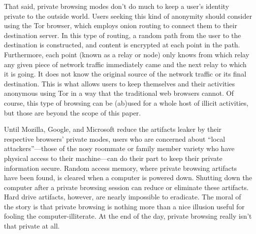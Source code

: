 \documentclass[pdftex,letterpaper,titlepage,12pt]{article}
\begin{document}
  That said, private browsing modes don't do much to keep a user's identity
  private to the outside world. Users seeking this kind of anonymity should 
  consider using the Tor browser, which employs onion routing to connect them 
  to their destination server. In this type of routing, a random path from the 
  user to the destination is constructed, and content is encrypted at each 
  point in the path. Furthermore, each point (known as a relay or node) only 
  knows from which relay any given piece of network traffic immediately came 
  and the next relay to which it is going. It does not know the original source
  of the network traffic or its final destination. This is what allows users to
  keep themselves and their activities anonymous using Tor in a way that the 
  traditional web browsers cannot.\cite{tor13} Of course, this type of browsing
  can be (ab)used for a whole host of illicit activities, but those are beyond
  the scope of this paper.

  Until Mozilla, Google, and Microsoft reduce the artifacts leaker by their
  respective browsers' private modes, users who are concerned about ``local 
  attackers''---those of the nosy roommate or family member variety who have 
  physical access to their machine---can do their part to keep their private
  information secure. Random access memory, where private browsing artifacts
  have been found, is cleared when a computer is powered down. Shutting down
  the computer after a private browsing session can reduce or eliminate these
  artifacts. Hard drive artifacts, however, are nearly impossible to eradicate.
  The moral of the story is that private browsing is nothing more than a nice
  illusion useful for fooling the computer-illiterate. At the end of the day,
  private browsing really isn't that private at all.
\end{document}
